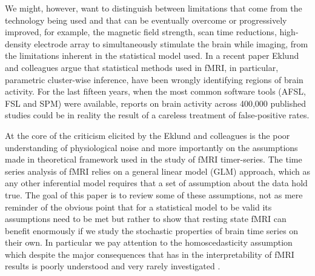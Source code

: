 \documentclass[10pt,letterpaper]{article}
\begin{document}

 
We might, however, want to distinguish between limitations that come from the technology being used and that can be eventually overcome or progressively improved, for example, the magnetic field strength, scan time reductions, high-density electrode array to simultaneously stimulate the brain while imaging, from the limitations inherent in the statistical model used. In a recent paper \cite{eklund2016cluster} Eklund and colleagues argue that statistical methods used in fMRI, in particular, parametric cluster-wise inference, have been wrongly identifying regions of brain activity. For the last fifteen years, when the most common software tools (AFSL, FSL and SPM) were available, reports on brain activity across 400,000 published studies could be in reality the result of a careless treatment of false-positive rates. 

At the core of the criticism elicited by the Eklund and colleagues is the poor understanding of physiological noise and more importantly on the assumptions  
made in theoretical framework used in the study of fMRI timer-series. The time series analysis of fMRI relies on a general linear model (GLM) approach, which as any other inferential model requires that a set of assumption about the data hold true. 
The goal of this paper is to review some of these assumptions, not as mere reminder of the obvious point that for a statistical model to be valid its assumptions need to be met but rather to show that resting state fMRI can benefit enormously if we study the stochastic properties of brain time series on their own. In particular we pay attention to the homoscedasticity assumption which despite the major consequences that has in the interpretability of fMRI results is poorly understood and very rarely investigated \citep{lindquist2014evaluating}. 
\end{document}
